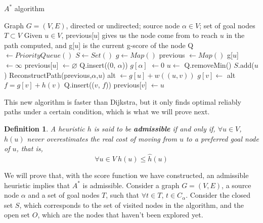 \documentclass[12pt]{report}
\newtheorem{definition}[theorem]{Definition}
\begin{document}
\begin{algorithm}
\caption{$A^*$ algorithm}
\label{alg:astar}
\begin{algorithmic}[1]
\Require Graph $G = (V, E)$, directed or undirected; source node $\alpha \in V$; set of goal nodes $T \subset V$
\Ensure Given $u \in V$, previous[$u$] gives us the node come from to reach $u$ in the path computed, and g[$u$] is the current g-score of the node
\State Q $\gets PriorityQueue()$
\State $S \gets Set()$
\State $g \gets Map()$
\State previous $\gets Map()$
	\State g[$u$] $\gets \infty$
	\State previous[$u$] $\gets \varnothing$
\EndFor
\State Q.insert((0, $\alpha$))
\State $g[\alpha]$ $\gets 0$
	\State $u \gets$ Q.removeMin()
	\State $S$.add($u$)
	 
		\State \Return ReconstructPath(previous,$\alpha$,$u$)
	\EndIf
		\State alt $\gets g[u] + w((u, v))$
			\State $g[v] \gets$ alt 
			\State $f = g[v] + h(v)$
			\State Q.insert(($v$, $f$))
			\State previous[$v$] $\gets u$
		\EndIf
	\EndFor
\EndWhile
\EndProcedure
\end{algorithmic}
\end{algorithm}

This new algorithm is faster than Dijkstra, but it only finds optimal reliably paths under a certain condition, which is what we will prove next.

\begin{definition}
A heuristic $h$ is said to be \textbf{admissible} if and only if, $\forall u \in V$, $h(u)$ never overestimates the real cost of moving from $u$ to a preferred goal node of $u$, that is, 
\[ \forall u \in V \ h(u) \le \hat{h}(u) \]
\end{definition}

We will prove that, with the score function we have constructed, an admissible heuristic implies that $A^*$ is admissible. Consider a graph $G = (V, E)$, a source node $\alpha$ and a set of goal nodes $T$, such that $\forall t \in T$, $t \in C_\alpha$. Consider the closed set $S$, which corresponds to the set of visited nodes in the algorithm, and the open set $O$, which are the nodes that haven't been explored yet.
\end{document}

